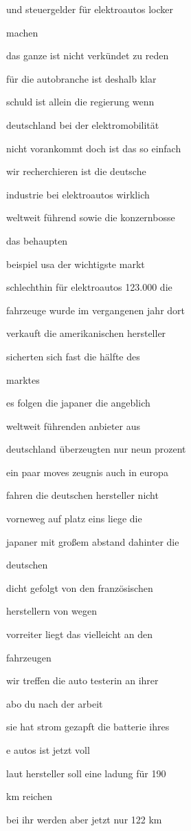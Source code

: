 \documentclass[a4paper, 11pt]{book} %
\begin{document}
und steuergelder für elektroautos locker

machen

das ganze ist nicht verkündet zu reden

für die autobranche ist deshalb klar

schuld ist allein die regierung wenn

deutschland bei der elektromobilität

nicht vorankommt doch ist das so einfach

wir recherchieren ist die deutsche

industrie bei elektroautos wirklich

weltweit führend sowie die konzernbosse

das behaupten

beispiel usa der wichtigste markt

schlechthin für elektroautos 123.000 die

fahrzeuge wurde im vergangenen jahr dort

verkauft die amerikanischen hersteller

sicherten sich fast die hälfte des

marktes

es folgen die japaner die angeblich

weltweit führenden anbieter aus

deutschland überzeugten nur neun prozent

ein paar moves zeugnis auch in europa

fahren die deutschen hersteller nicht

vorneweg auf platz eins liege die

japaner mit großem abstand dahinter die

deutschen

dicht gefolgt von den französischen

herstellern von wegen

vorreiter liegt das vielleicht an den

fahrzeugen

wir treffen die auto testerin an ihrer

abo du nach der arbeit

sie hat strom gezapft die batterie ihres

e autos ist jetzt voll

laut hersteller soll eine ladung für 190

km reichen

bei ihr werden aber jetzt nur 122 km
\end{document}
